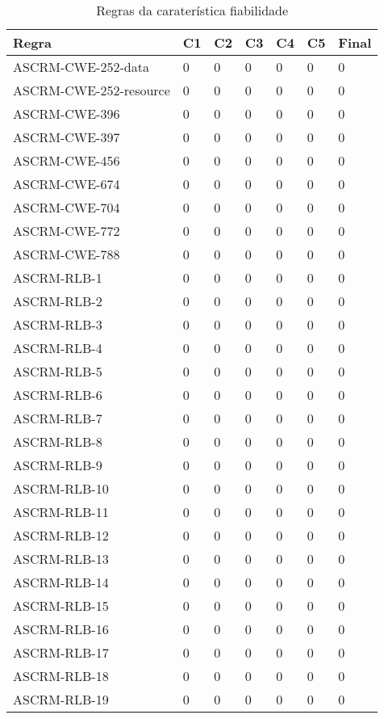 \documentclass[openany,10pt,a4paper]{article}
\begin{document}
\begin{longtable}{p{1.6in}|p{0.28in}|p{0.28in}|p{0.28in}|p{0.28in}|p{0.28in}|p{0.35in}}
	\caption{Regras da caraterística fiabilidade}
	\label{variability_impl_mech}
	\endhead
	\hline	
		\textbf{Regra} & \textbf{C1} & \textbf{C2} & \textbf{C3} & \textbf{C4} & \textbf{C5} & \textbf{Final} \\ \hline
ASCRM-CWE-252-data & 0 & 0 & 0 & 0 & 0 & 0 \\ \hline
ASCRM-CWE-252-resource & 0 & 0 & 0 & 0 & 0 & 0 \\ \hline
ASCRM-CWE-396 & 0 & 0 & 0 & 0 & 0 & 0 \\ \hline
ASCRM-CWE-397 & 0 & 0 & 0 & 0 & 0 & 0 \\ \hline
ASCRM-CWE-456 & 0 & 0 & 0 & 0 & 0 & 0 \\ \hline
ASCRM-CWE-674 & 0 & 0 & 0 & 0 & 0 & 0 \\ \hline
ASCRM-CWE-704 & 0 & 0 & 0 & 0 & 0 & 0 \\ \hline
ASCRM-CWE-772 & 0 & 0 & 0 & 0 & 0 & 0 \\ \hline
ASCRM-CWE-788 & 0 & 0 & 0 & 0 & 0 & 0 \\ \hline
ASCRM-RLB-1 & 0 & 0 & 0 & 0 & 0 & 0 \\ \hline
ASCRM-RLB-2 & 0 & 0 & 0 & 0 & 0 & 0 \\ \hline
ASCRM-RLB-3 & 0 & 0 & 0 & 0 & 0 & 0 \\ \hline
ASCRM-RLB-4 & 0 & 0 & 0 & 0 & 0 & 0 \\ \hline
ASCRM-RLB-5 & 0 & 0 & 0 & 0 & 0 & 0 \\ \hline
ASCRM-RLB-6 & 0 & 0 & 0 & 0 & 0 & 0 \\ \hline
ASCRM-RLB-7 & 0 & 0 & 0 & 0 & 0 & 0 \\ \hline
ASCRM-RLB-8 & 0 & 0 & 0 & 0 & 0 & 0 \\ \hline
ASCRM-RLB-9 & 0 & 0 & 0 & 0 & 0 & 0 \\ \hline
ASCRM-RLB-10 & 0 & 0 & 0 & 0 & 0 & 0 \\ \hline
ASCRM-RLB-11 & 0 & 0 & 0 & 0 & 0 & 0 \\ \hline
ASCRM-RLB-12 & 0 & 0 & 0 & 0 & 0 & 0 \\ \hline
ASCRM-RLB-13 & 0 & 0 & 0 & 0 & 0 & 0 \\ \hline
ASCRM-RLB-14 & 0 & 0 & 0 & 0 & 0 & 0 \\ \hline
ASCRM-RLB-15 & 0 & 0 & 0 & 0 & 0 & 0 \\ \hline
ASCRM-RLB-16 & 0 & 0 & 0 & 0 & 0 & 0 \\ \hline
ASCRM-RLB-17 & 0 & 0 & 0 & 0 & 0 & 0 \\ \hline
ASCRM-RLB-18 & 0 & 0 & 0 & 0 & 0 & 0 \\ \hline
ASCRM-RLB-19 & 0 & 0 & 0 & 0 & 0 & 0 \\ \hline
\end{longtable} 
\end{document}
